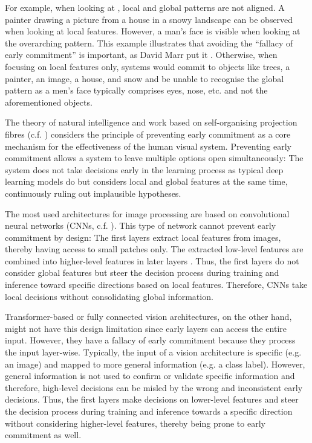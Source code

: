 For example, when looking at , local and global patterns are not aligned. A painter drawing a picture from a house in a snowy landscape can be observed when looking at local features. However, a man's face is visible when looking at the overarching pattern.
This example illustrates that avoiding the ``fallacy of early commitment'' is important, as David Marr put it .
Otherwise, when focusing on local features only, systems would commit to objects like trees, a painter, an image, a house, and snow and be unable to recognise the global pattern as a men's face typically comprises eyes, nose, etc. and not the aforementioned objects.

The theory of natural intelligence  and work based on self-organising projection fibres (c.f. ) considers the principle of preventing early commitment as a core mechanism for the effectiveness of the human visual system.
Preventing early commitment allows a system to leave multiple options open simultaneously: The system does not take decisions early in the learning process as typical deep learning models do but considers local and global features at the same time, continuously ruling out implausible hypotheses.

The most used architectures for image processing are based on convolutional neural networks (CNNs, c.f. ). This type of network cannot prevent early commitment by design: The first layers extract local features from images, thereby having access to small patches only. The extracted low-level features are combined into higher-level features in later layers . Thus, the first layers do not consider global features but steer the decision process during training and inference toward specific directions based on local features. Therefore, CNNs take local decisions without consolidating global information.

Transformer-based  or fully connected  vision architectures, on the other hand, might not have this design limitation since early layers can access the entire input.
However, they have a fallacy of early commitment because they process the input layer-wise. Typically, the input of a vision architecture is specific (e.g. an image) and mapped to more general information (e.g. a class label).
However, general information is not used to confirm or validate specific information and therefore, high-level decisions can be misled by the wrong and inconsistent early decisions.
Thus, the first layers make decisions on lower-level features and steer the decision process during training and inference towards a specific direction without considering higher-level features, thereby being prone to early commitment as well.

